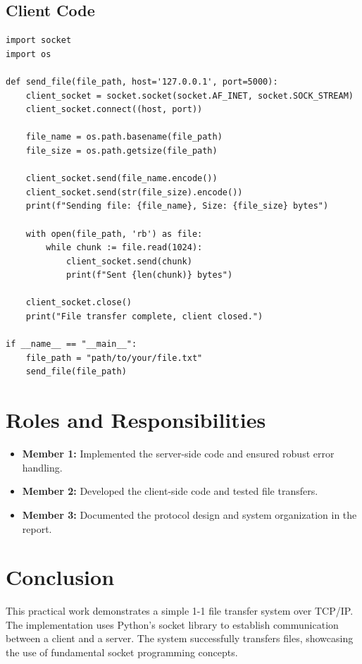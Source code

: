 \documentclass[a4paper, 12pt]{article}
\begin{document}
\subsection{Client Code}
\begin{lstlisting}[caption=Client Code]
import socket
import os

def send_file(file_path, host='127.0.0.1', port=5000):
    client_socket = socket.socket(socket.AF_INET, socket.SOCK_STREAM)
    client_socket.connect((host, port))

    file_name = os.path.basename(file_path)
    file_size = os.path.getsize(file_path)

    client_socket.send(file_name.encode())
    client_socket.send(str(file_size).encode())
    print(f"Sending file: {file_name}, Size: {file_size} bytes")

    with open(file_path, 'rb') as file:
        while chunk := file.read(1024):
            client_socket.send(chunk)
            print(f"Sent {len(chunk)} bytes")
    
    client_socket.close()
    print("File transfer complete, client closed.")

if __name__ == "__main__":
    file_path = "path/to/your/file.txt"
    send_file(file_path)
\end{lstlisting}

\section{Roles and Responsibilities}
\begin{itemize}
    \item \textbf{Member 1:} Implemented the server-side code and ensured robust error handling.
    \item \textbf{Member 2:} Developed the client-side code and tested file transfers.
    \item \textbf{Member 3:} Documented the protocol design and system organization in the report.
\end{itemize}

\section{Conclusion}
This practical work demonstrates a simple 1-1 file transfer system over TCP/IP. The implementation uses Python's socket library to establish communication between a client and a server. The system successfully transfers files, showcasing the use of fundamental socket programming concepts.
\end{document}
